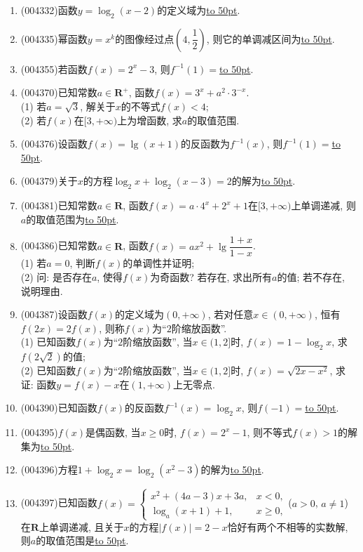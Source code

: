 \documentclass[10pt,a4paper]{article}
\newcommand{\blank}[1]{\underline{\hbox to #1pt{}}}
\begin{document}
\begin{enumerate}[1.]
\item {\tiny (004332)}函数$y=\log_2(x-2)$的定义域为\blank{50}.
\item {\tiny (004335)}幂函数$y=x^k$的图像经过点$(4,\dfrac 12)$, 则它的单调减区间为\blank{50}.
\item {\tiny (004355)}若函数$f(x)=2^x-3$, 则$f^{-1}(1)=$\blank{50}.
\item {\tiny (004370)}已知常数$a\in \mathbf{R}^+$, 函数$f(x)=3^x+a^2\cdot 3^{-x}$.\\
(1) 若$a=\sqrt 3$, 解关于$x$的不等式$f(x)<4$;\\
(2) 若$f(x)$在$[3,+\infty)$上为增函数, 求$a$的取值范围.
\item {\tiny (004376)}设函数$f(x)=\lg (x+1)$的反函数为$f^{-1}(x)$, 则$f^{-1}(1)=$\blank{50}.
\item {\tiny (004379)}关于$x$的方程$\log_2 x+\log_2(x-3)=2$的解为\blank{50}.
\item {\tiny (004381)}已知常数$a\in \mathbf{R}$, 函数$f(x)=a\cdot 4^x+2^x+1$在$[3,+\infty)$上单调递减, 则$a$的取值范围为\blank{50}.
\item {\tiny (004386)}已知常数$a\in \mathbf{R}$, 函数$f(x)=ax^2+\lg \dfrac{1+x}{1-x}$.\\
(1) 若$a=0$, 判断$f(x)$的单调性并证明;\\
(2) 问: 是否存在$a$, 使得$f(x)$为奇函数? 若存在, 求出所有$a$的值; 若不存在, 说明理由.
\item {\tiny (004387)}设函数$f(x)$的定义域为$(0,+\infty)$, 若对任意$x\in (0,+\infty)$, 恒有$f(2x)=2f(x)$, 则称$f(x)$为``$2$阶缩放函数''.\\
(1) 已知函数$f(x)$为``$2$阶缩放函数'', 当$x\in (1,2]$时, $f(x)=1-\log_2 x$, 求$f(2\sqrt{2})$的值;\\
(2) 已知函数$f(x)$为``$2$阶缩放函数'', 当$x\in (1,2]$时, $f(x)=\sqrt{2x-x^2}$, 求证: 函数$y=f(x)-x$在$(1,+\infty)$上无零点.
\item {\tiny (004390)}已知函数$f(x)$的反函数$f^{-1}(x)=\log_2x$, 则$f(-1)=$\blank{50}.
\item {\tiny (004395)}$f(x)$是偶函数, 当$x\ge 0$时, $f(x)=2^x-1$, 则不等式$f(x)>1$的解集为\blank{50}.
\item {\tiny (004396)}方程$1+\log_2x=\log_2(x^2-3)$的解为\blank{50}.
\item {\tiny (004397)}已知函数$f(x)=\begin{cases}  x^2+(4a-3)x+3a,& x<0, \\ \log_a(x+1)+1,& x\ge 0, \end{cases}$($a>0$, $a\ne 1$)在$\mathbf{R}$上单调递减, 且关于$x$的方程$|f(x)|=2-x$恰好有两个不相等的实数解, 则$a$的取值范围是\blank{50}.

\end{enumerate}
\end{document}
